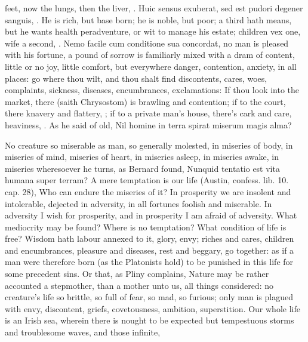 {feet, now the lungs, then the liver, \etc{}. Huic sensus exuberat, sed est
pudori degener sanguis, \etc{}. He is rich, but base born; he is noble, but
poor; a third hath means, but he wants health peradventure, or wit to
manage his estate; children vex one, wife a second, \etc{}. Nemo facile cum
conditione sua concordat, no man is pleased with his fortune, a pound
of sorrow is familiarly mixed with a dram of content, little or no joy,
little comfort, but everywhere danger, contention, anxiety, in
all places: go where thou wilt, and thou shalt find discontents, cares,
woes, complaints, sickness, diseases, encumbrances, exclamations: If
thou look into the market, there (saith  Chrysostom) is brawling
and contention; if to the court, there knavery and flattery, \etc{}; if to
a private man's house, there's cark and care, heaviness, \etc{}. As he said
of old,
Nil homine in terra spirat miserum magis alma?

No creature so miserable as man, so generally molested, in
miseries of body, in miseries of mind, miseries of heart, in miseries
asleep, in miseries awake, in miseries wheresoever he turns, as Bernard
found, Nunquid tentatio est vita humana super terram? A mere temptation
is our life (Austin, confess. lib. 10. cap. 28),  Who can endure
the miseries of it? In prosperity we are insolent and
intolerable, dejected in adversity, in all fortunes foolish and
miserable. In adversity I wish for prosperity, and in prosperity
I am afraid of adversity. What mediocrity may be found? Where is no
temptation? What condition of life is free? Wisdom hath labour
annexed to it, glory, envy; riches and cares, children and
encumbrances, pleasure and diseases, rest and beggary, go together: as
if a man were therefore born (as the Platonists hold) to be punished in
this life for some precedent sins. Or that, as Pliny complains,
Nature may be rather accounted a stepmother, than a mother unto us, all
things considered: no creature's life so brittle, so full of fear, so
mad, so furious; only man is plagued with envy, discontent, griefs,
covetousness, ambition, superstition. Our whole life is an Irish sea,
wherein there is nought to be expected but tempestuous storms and
troublesome waves, and those infinite,

}
